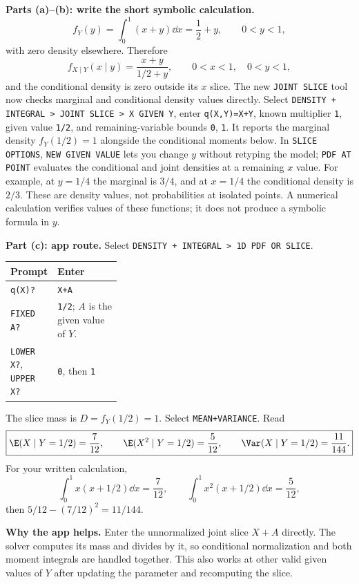 \textbf{Parts (a)--(b): write the short symbolic calculation.}
\[
f_Y(y)=\int_0^1(x+y)\dd x=\frac12+y,\qquad 0<y<1,
\]
with zero density elsewhere. Therefore
\[
f_{X\mid Y}(x\mid y)=\frac{x+y}{1/2+y},\qquad 0<x<1,\quad 0<y<1,
\]
and the conditional density is zero outside its $x$ slice. The new \texttt{JOINT SLICE} tool now checks marginal and conditional density values directly. Select \texttt{DENSITY + INTEGRAL > JOINT SLICE > X GIVEN Y}, enter \texttt{q(X,Y)=X+Y}, known multiplier \texttt{1}, given value \texttt{1/2}, and remaining-variable bounds \texttt{0}, \texttt{1}. It reports the marginal density $f_Y(1/2)=1$ alongside the conditional moments below. In \texttt{SLICE OPTIONS}, \texttt{NEW GIVEN VALUE} lets you change $y$ without retyping the model; \texttt{PDF AT POINT} evaluates the conditional and joint densities at a remaining $x$ value. For example, at $y=1/4$ the marginal is $3/4$, and at $x=1/4$ the conditional density is $2/3$. These are density values, not probabilities at isolated points. A numerical calculation verifies values of these functions; it does not produce a symbolic formula in $y$.

\textbf{Part (c): app route.} Select \texttt{DENSITY + INTEGRAL > 1D PDF OR SLICE}.
\begin{center}
\begin{tabularx}{\linewidth}{@{}p{0.32\linewidth}X@{}}
\toprule Prompt & Enter\\\midrule
\texttt{q(X)?} & \texttt{X+A}\\
\texttt{FIXED A?} & \texttt{1/2}; $A$ is the given value of $Y$.\\
\texttt{LOWER X?}, \texttt{UPPER X?} & \texttt{0}, then \texttt{1}\\\bottomrule
\end{tabularx}
\end{center}
The slice mass is $D=f_Y(1/2)=1$. Select \texttt{MEAN+VARIANCE}. Read
\[
\boxed{\E(X\mid Y=1/2)=\frac7{12},\qquad
\E(X^2\mid Y=1/2)=\frac5{12},\qquad
\Var(X\mid Y=1/2)=\frac{11}{144}.}
\]
For your written calculation,
\[
\int_0^1x(x+1/2)\dd x=\frac7{12},\qquad
\int_0^1x^2(x+1/2)\dd x=\frac5{12},
\]
then $5/12-(7/12)^2=11/144$.

\textbf{Why the app helps.} Enter the unnormalized joint slice $X+A$ directly. The solver computes its mass and divides by it, so conditional normalization and both moment integrals are handled together. This also works at other valid given values of $Y$ after updating the parameter and recomputing the slice.

